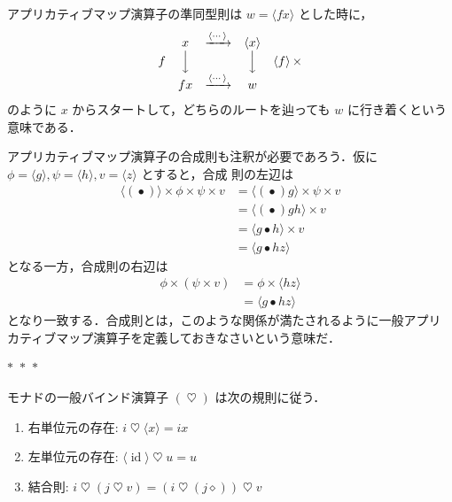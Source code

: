 \documentclass[a5paper,twoside,fleqn,draft]{jsbook}
\newcommand{\separator}{\begin{center}$*$~$*$~$*$\end{center}}
\newcommand{\mAnonParam}{\diamond}
\newcommand{\mSpecialFunc}[1]{#1}
\DeclareMathOperator{\mId}{\mSpecialFunc{id}}
\DeclareMathOperator{\mAppMap}{\times}
\DeclareMathOperator{\mBind}{\heartsuit}
\DeclareMathOperator{\mBindComp}{\maltese}
\DeclareMathOperator{\mComp}{\bullet}
\newcommand{\mPureWith}[1]{\langle#1\rangle}
\begin{document}
アプリカティブマップ演算子の準同型則は $w=\mPureWith{fx}$ とした時に，
\begin{equation}
\begin{matrix}
&x&\xrightarrow{\mPureWith{\dotsb}}&\mPureWith{x}\\
f&\Big\downarrow&&\Big\downarrow&\mPureWith{f}\mAppMap\\
&fx&\xrightarrow{\mPureWith{\dotsb}}&w
\end{matrix}
\end{equation}
のように $x$ からスタートして，どちらのルートを辿っても $w$ に行き着くという意味である．

アプリカティブマップ演算子の合成則も注釈が必要であろう．仮に
$\phi=\mPureWith{g},\psi=\mPureWith{h},v=\mPureWith{z}$ とすると，合成
則の左辺は
\begin{align}
\mPureWith{(\mComp)}\mAppMap\phi\mAppMap\psi\mAppMap v
&=\mPureWith{(\mComp)g}\mAppMap\psi\mAppMap v\\
&=\mPureWith{(\mComp)gh}\mAppMap v\\
&=\mPureWith{g\mComp h}\mAppMap v\\
&=\mPureWith{g\mComp hz}
\end{align}
となる一方，合成則の右辺は
\begin{align}
\phi\mAppMap{}(\psi\mAppMap v)
&=\phi\mAppMap\mPureWith{hz}\\
&=\mPureWith{g\mComp hz}
\end{align}
となり一致する．合成則とは，このような関係が満たされるように一般アプリ
カティブマップ演算子を定義しておきなさいという意味だ．

\separator

モナドの一般バインド演算子 $(\mBind)$ は次の規則に従う．
\begin{enumerate}
\item 右単位元の存在: $i\mBind{}\mPureWith{x}=ix$
\item 左単位元の存在: $\mPureWith{\mId}\mBind u=u$
\item 結合則: $i\mBind{}(j\mBind v)=(i\mBind{}(j\mAnonParam))\mBind v$
\end{enumerate}
\end{document}
